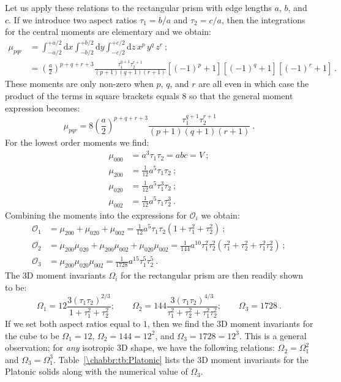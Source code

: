 Let us apply these relations to the rectangular prism with edge lengths $a$, $b$, and $c$.   If we introduce two aspect ratios $\tau_1=b/a$ and $\tau_2=c/a$, then the integrations for the central moments are elementary and we obtain:
\begin{equation*}
\begin{split}
	\mu_{pqr} &= \int_{-a/2}^{+a/2}\!\!\!\mathrm{d}x \int_{-b/2}^{+b/2}\!\!\!\mathrm{d}y \int_{-c/2}^{+c/2}\!\!\!\mathrm{d}z \,x^p\,y^q\, z^r\ ;\\
	 &=\left(\frac{a}{2}\right)^{p+q+r+3}\frac{\tau_1^{q+1}\tau_2^{r+1}}{(p+1)(q+1)(r+1)} [(-1)^p+1][(-1)^q+1][(-1)^r+1]\ .
	 \end{split}
\end{equation*}	
These moments are only non-zero when $p$, $q$, and $r$ are all even in which case the product of the terms in square brackets equals $8$ so that the general moment expression becomes:
\[
	\mu_{pqr} = 8 \left(\frac{a}{2}\right)^{p+q+r+3}\frac{\tau_1^{q+1}\tau_2^{r+1}}{(p+1)(q+1)(r+1)}\ .
\]
For the lowest order moments we find:
\begin{equation}
	\begin{split}
		\mu_{000} &= a^3\tau_1\tau_2 = abc=V\ ;\\
		\mu_{200} &= \frac{1}{12}a^5\tau_1\tau_2\ ;\\
		\mu_{020} &= \frac{1}{12}a^5\tau_1^3\tau_2\ ;\\
		\mu_{002} &= \frac{1}{12}a^5\tau_1\tau_2^3\ .
	\end{split}
\end{equation}
Combining the moments into the expressions for $\mathcal{O}_i$ we obtain:
\begin{equation}
\begin{split}
	\mathcal{O}_1 &= \mu_{200}+\mu_{020}+\mu_{002} = \frac{1}{12} a^5 \tau_1 \tau_2 \left(1+\tau_1^2+\tau_2^2\right)\ ;\\
	\mathcal{O}_2 &= \mu_{200}\mu_{020}+\mu_{200}\mu_{002}+\mu_{020}\mu_{002}= \frac{1}{144}a^{10}\tau_1^2\tau_2^2(\tau_1^2+\tau_2^2+\tau_1^2\tau_2^2)\ ;\\
	\mathcal{O}_3 &= \mu_{200}\mu_{020}\mu_{002} = \frac{1}{1728}a^{15}\tau_1^5\tau_2^5\ .
\end{split}
\end{equation}
The 3D moment invariants $\Omega_i$ for the rectangular prism are then readily shown to be:
\begin{equation}
	\Omega_1 = 12 \frac{3(\tau_1\tau_2)^{2/3}}{1+\tau_1^2+\tau_2^2};\qquad 
	\Omega_2 = 144 \frac{3(\tau_1\tau_2)^{4/3}}{\tau_1^2+\tau_2^2+\tau_1^2\tau_2^2};\qquad
	\Omega_3 = 1728\ .
\end{equation}
If we set both aspect ratios equal to $1$, then we find the 3D moment invariants for the cube to be $\Omega_1=12$, $\Omega_2=144=12^2$, and $\Omega_3=1728=12^3$.  This is a general observation; for \textit{any} isotropic 3D shape, we have the following relations: $\Omega_2=\Omega_1^2$ and $\Omega_3=\Omega_1^3$. Table~\ref{\chabbr:tb:Platonic} lists the 3D moment invariants for the Platonic solids along with the numerical value of $\Omega_3$.

